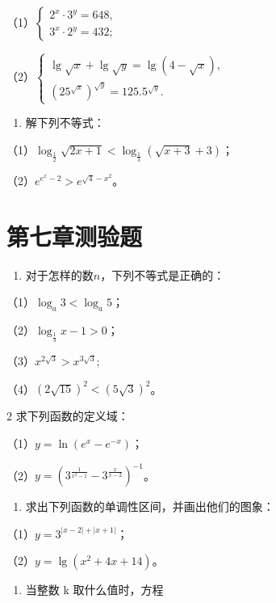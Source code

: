 （1）\(\left\{ \begin{array}{l} 2^{x} \cdot 3^{y} = 648, \\ 3^{x} \cdot 2^{y} = 432; \end{array} \right.\)

（2）\(\left\{ \begin{array}{l} \lg \sqrt{x} + \lg \sqrt{y} = \lg (4 - \sqrt{x}), \\ (25^{\sqrt{x}})^{\sqrt{y}} = 125.5^{\sqrt{y}}. \end{array} \right.\)

\begin{enumerate}[start=5]
\item
  解下列不等式：
\end{enumerate}

（1）\(\log_{\frac{1}{2}}\sqrt{2x + 1} < \log_{\frac{1}{3}}(\sqrt{x + 3} + 3)\)；

（2）\(e^{e^{x} - 2} > e^{\sqrt{4} - x^2}\)。

\section{第七章测验题}

\begin{enumerate}
\item
  对于怎样的数\(n\)，下列不等式是正确的：
\end{enumerate}

（1）\(\log_a 3 < \log_a 5\)；

（2）\(\log_{\frac{1}{3}} x - 1 > 0\)；

（3）\(x^{2\sqrt{3}} > x^{3\sqrt{3}};\)

（4）\((2\sqrt{15})^2 < (5\sqrt{3})^2\)。

2 求下列函数的定义域：

（1）\(y = \ln (e^x - e^{-x})\)；

（2）\(y = (3^{\frac{1}{x^2 - 1}} - 3^{\frac{x}{x - 2}})^{-1}\)。

\begin{enumerate}[start=3]
\item
  求出下列函数的单调性区间，并画出他们的图象：
\end{enumerate}

（1）\(y = 3^{|x - 2| + |x + 1|}\)；

（2）\(y = \lg (x^2 + 4x + 14)\)。

\begin{enumerate}[start=4]
\item
  当整数 k 取什么值时，方程
\end{enumerate}

